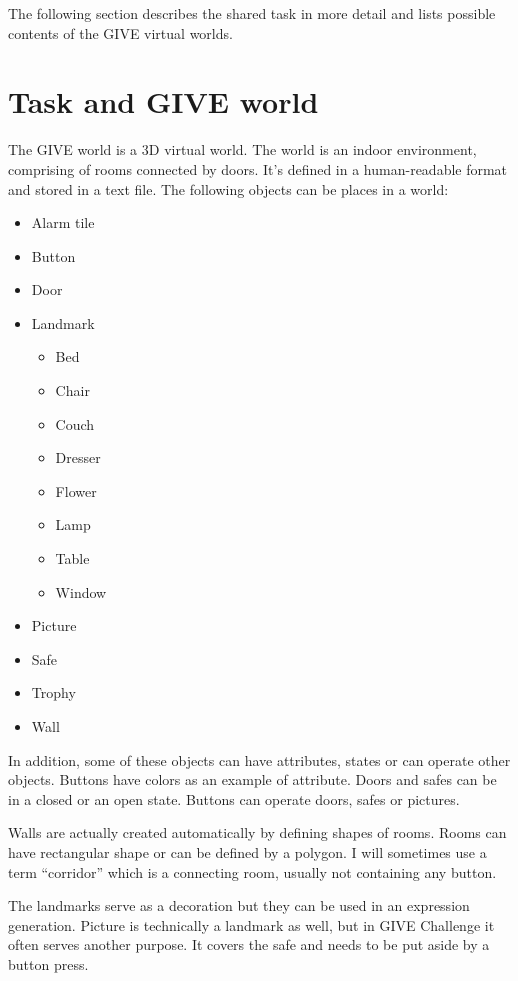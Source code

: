 The following section describes the shared task in more detail and lists possible contents of the GIVE virtual worlds.

\section{Task and GIVE world}
\label{sec:task-give-world}
The GIVE world is a 3D virtual world. The world is an indoor environment, comprising of rooms  connected by doors. It's defined in a human-readable format and stored in a text file. The following objects can be places in a world:

\begin{itemize}
\item
Alarm tile
\item
Button
\item
Door
\item 
Landmark
	\begin{itemize}
	\item
	Bed	
	\item
	Chair	
	\item
	Couch	
	\item
	Dresser
	\item
	Flower	
	\item
	Lamp
	\item
	Table
	\item
	Window
	\end{itemize}
\item
Picture
\item
Safe
\item
Trophy
\item
Wall
\end{itemize}
In addition, some of these objects can have attributes, states or can operate other objects. Buttons have colors as an example of attribute. Doors and safes can be in a closed or an open state. Buttons can operate doors, safes or pictures.

Walls are actually created automatically by defining shapes of rooms. Rooms can have rectangular shape or can be defined by a polygon. I will sometimes use a term ``corridor'' which is a connecting room, usually not containing any button.

The landmarks serve as a decoration but they can be used in an expression generation. Picture is technically a landmark as well, but in GIVE Challenge it often serves another purpose. It covers the safe and needs to be put aside by a button press.

